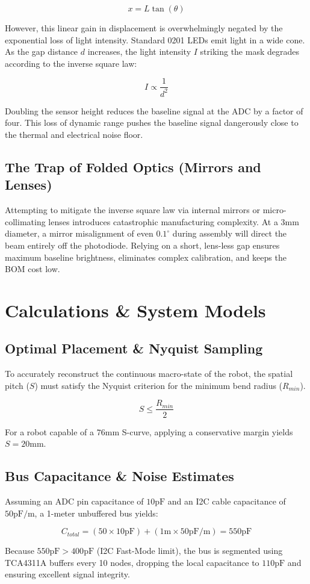 \documentclass[11pt]{article}
\begin{document}
$$x = L \tan(\theta)$$

However, this linear gain in displacement is overwhelmingly negated by the exponential loss of light intensity. Standard 0201 LEDs emit light in a wide cone. As the gap distance $d$ increases, the light intensity $I$ striking the mask degrades according to the inverse square law:



$$I \propto \frac{1}{d^2}$$

Doubling the sensor height reduces the baseline signal at the ADC by a factor of four. This loss of dynamic range pushes the baseline signal dangerously close to the thermal and electrical noise floor. 

\subsection{The Trap of Folded Optics (Mirrors and Lenses)}
Attempting to mitigate the inverse square law via internal mirrors or micro-collimating lenses introduces catastrophic manufacturing complexity. At a 3mm diameter, a mirror misalignment of even $0.1^\circ$ during assembly will direct the beam entirely off the photodiode. Relying on a short, lens-less gap ensures maximum baseline brightness, eliminates complex calibration, and keeps the BOM cost low.

\section{Calculations \& System Models}
\subsection{Optimal Placement \& Nyquist Sampling}
To accurately reconstruct the continuous macro-state of the robot, the spatial pitch ($S$) must satisfy the Nyquist criterion for the minimum bend radius ($R_{min}$).

$$S \leq \frac{R_{min}}{2}$$

For a robot capable of a $76\text{mm}$ S-curve, applying a conservative margin yields $S = 20\text{mm}$.

\subsection{Bus Capacitance \& Noise Estimates}
Assuming an ADC pin capacitance of $10\text{pF}$ and an I2C cable capacitance of $50\text{pF/m}$, a 1-meter unbuffered bus yields:

$$C_{total} = (50 \times 10\text{pF}) + (1\text{m} \times 50\text{pF/m}) = 550\text{pF}$$

Because $550\text{pF} > 400\text{pF}$ (I2C Fast-Mode limit), the bus is segmented using TCA4311A buffers every 10 nodes, dropping the local capacitance to $110\text{pF}$ and ensuring excellent signal integrity.
\end{document}
